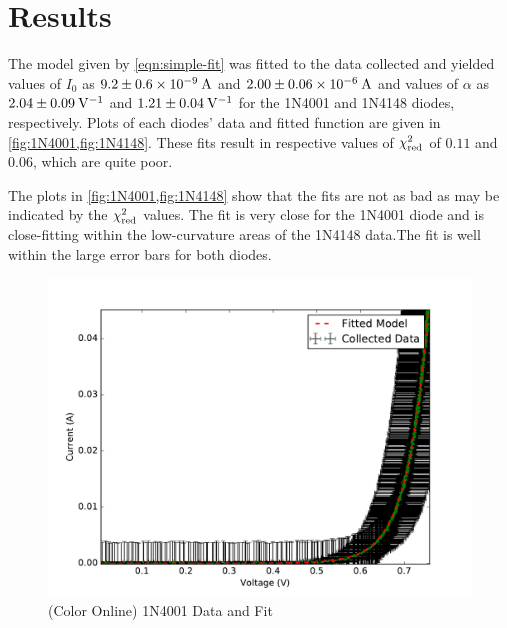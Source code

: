 \documentclass[reprint]{revtex4-1}
\begin{document}
\section{Results}

The model given by \cref{eqn:simple-fit} was fitted to the data collected and yielded values of $I_0$ as $9.2 \pm 0.6 \times 10^{-9}\:\rm{A}$ and $2.00 \pm 0.06 \times 10^{-6}\:\rm{A}$ and values of $\alpha$ as $2.04 \pm 0.09\:\rm{V}^{-1}$ and $1.21 \pm 0.04\:\rm{V}^{-1}$ for the \textsc{1N4001} and \textsc{1N4148} diodes, respectively. Plots of each diodes' data and fitted function are given in \cref{fig:1N4001,fig:1N4148}. These fits result in respective values of $\chi^2_{\rm{red}}$ of $0.11$ and $0.06$, which are quite poor.

The plots in \cref{fig:1N4001,fig:1N4148} show that the fits are not as bad as may be indicated by the $\chi^2_{\rm{red}}$ values. The fit is very close for the \textsc{1N4001} diode and is close-fitting within the low-curvature areas of the \textsc{1N4148} data.The fit is well within the large error bars for both diodes.

\begin{figure}
\includegraphics[width=\columnwidth]{../resources/plots/diode1_1n4001.pdf}
\caption{(Color Online) \textsc{1N4001} Data and Fit}
\label{fig:1N4001}
\end{figure}
\end{document}
